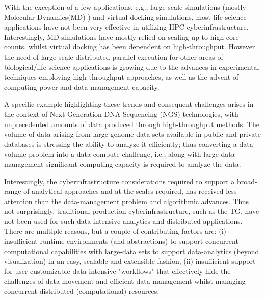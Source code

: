 \documentclass{sig-alternate}
\begin{document}


With the exception of a few applications, e.g., large-scale
simulations (mostly Molecular Dynamics(MD) ) and virtual-docking
simulations, most life-science applications have not been very
effective in utilizing HPC cyberinfrastructure.  Interestingly, MD
simulations have mostly relied on scaling-up to high core-counts,
whilst virtual docking has been dependent on high-throughput.  However
the need of large-scale distributed parallel execution for other
areas of biological/life-science applications is growing due to the
advances in experimental techniques employing high-throughput
approaches, as well as the advent of computing power and data
management capacity.  

A specific example highlighting these trends and consequent challenges
arises in the context of Next-Generation DNA Sequencing (NGS)
technologies, with unprecedented amounts of data produced through
high-throughput methods.  The volume of data arising from large genome
data sets available in public and private databases is stressing the
ability to analyze it efficiently; thus converting a data-volume
problem into a data-compute challenge, i.e., along with large data
management significant computing capacity is required to analyze the
data.



Interestingly, the cyberinfrastructure considerations required to
support a broad-range of analytical approaches and at the scales
required, has received less attention than the data-management problem
and algorithmic advances.  Thus not surprisingly, traditional
production cyberinfrastructure, such as the TG, have not been used for
such data-intensive analytics and distributed applications. There are
multiple reasons, but a couple of contributing factors are: (i)
insufficient runtime environments (and abstractions) to support
concurrent computational capabilities with large-data sets to support
data-analytics (beyond visualization) in an easy, scalable and
extensible fashion, (ii) insufficient support for user-customizable
data-intensive "workflows" that effectively hide the challenges of
data-movement and efficient data-management whilst managing concurrent
distributed (computational) resources.
\end{document}
